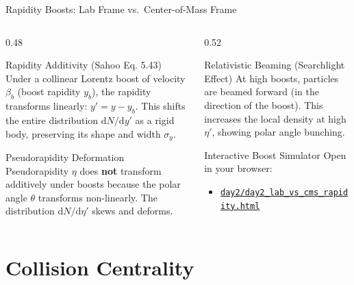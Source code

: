 \documentclass[aspectratio=169]{beamer}
\begin{document}
\begin{frame}{Rapidity Boosts: Lab Frame vs.\ Center-of-Mass Frame}
    \begin{columns}
        \begin{column}{0.48\textwidth}
            \begin{block}{Rapidity Additivity (Sahoo Eq. 5.43)}
                \footnotesize
                Under a collinear Lorentz boost of velocity $\beta_b$ (boost rapidity $y_b$), the rapidity transforms linearly: $y' = y - y_b$. This shifts the entire distribution $\mathrm{d}N/\mathrm{d}y'$ as a rigid body, preserving its shape and width $\sigma_y$.
            \end{block}
            \begin{block}{Pseudorapidity Deformation}
                \footnotesize
                Pseudorapidity $\eta$ does \textbf{not} transform additively under boosts because the polar angle $\theta$ transforms non-linearly. The distribution $\mathrm{d}N/\mathrm{d}\eta'$ skews and deforms.
            \end{block}
        \end{column}
        \begin{column}{0.52\textwidth}
            \begin{block}{Relativistic Beaming (Searchlight Effect)}
                At high boosts, particles are beamed forward (in the direction of the boost). This increases the local density at high $\eta'$, showing polar angle bunching.
            \end{block}
            \begin{alertblock}{Interactive Boost Simulator}
                Open in your browser:
                \begin{itemize}
                    \item \href{run:day2/day2_lab_vs_cms_rapidity.html}{\texttt{day2/day2\_lab\_vs\_cms\_rapidity.html}} 
                \end{itemize}
            \end{alertblock}
        \end{column}
    \end{columns}
\end{frame}

\section{Collision Centrality}
\end{document}
